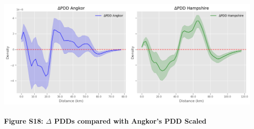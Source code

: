 \documentclass[
  11pt,
  letterpaper,
  DIV=11,
  numbers=noendperiod]{scrartcl}
\let\oldparagraph\paragraph
\renewcommand{\paragraph}[1]{\oldparagraph{#1}\mbox{}}
\begin{document}
\includegraphics{analysis_files/figure-pdf/cell-32-output-1.png}

\paragraph{\texorpdfstring{Figure S18: \(\Delta\) PDDs compared with
Angkor's PDD
Scaled}{Figure S18: \textbackslash Delta PDDs compared with Angkor's PDD Scaled}}\label{figure-s18-delta-pdds-compared-with-angkors-pdd-scaled}
\end{document}
